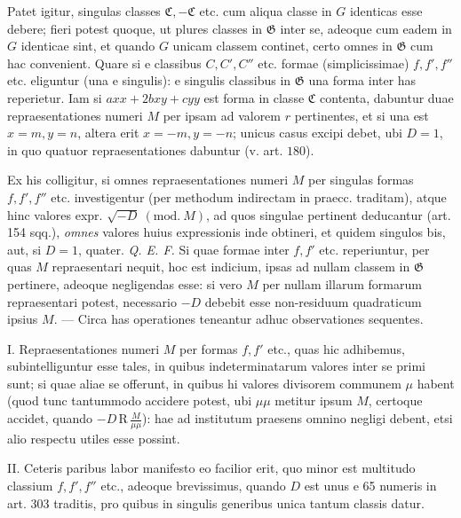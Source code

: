Patet igitur, singulas classes \(\mathfrak C,\allowbreak -\mathfrak C\) etc. cum aliqua classe in \(G\) identicas esse debere; fieri potest quoque, ut plures classes in \(\mathfrak G\) inter se, adeoque cum eadem in \(G\) identicae sint, et quando \(G\) unicam classem continet, certo omnes in \(\mathfrak G\) cum hac convenient. Quare si e classibus \(C,\allowbreak C',\allowbreak C''\) etc. formae (simplicissimae) \(f,\allowbreak f',\allowbreak f''\) etc. eliguntur (una e singulis): e singulis classibus in \(\mathfrak G\) una forma inter has reperietur. Iam si \(axx+2bxy+cyy\) est forma in classe \(\mathfrak C\) contenta, dabuntur duae repraesentationes numeri \(M\) per ipsam ad valorem \(r\) pertinentes, et si una est \(x=m,\allowbreak y=n\), altera erit \(x=-m,\allowbreak y=-n\); unicus casus excipi debet, ubi \(D=1\), in quo quatuor repraesentationes dabuntur (v. art. \(180\)).

Ex his colligitur, si omnes repraesentationes numeri \(M\) per singulas formas \(f,\allowbreak f',\allowbreak f''\) etc. investigentur (per methodum indirectam in praecc. traditam), atque
hinc valores expr. \(\surd{-D}\ (\mathrm{mod.}\ M)\), ad quos singulae pertinent deducantur (art. 154 sqq.), \textit{omnes} valores huius expressionis inde obtineri, et quidem singulos bis, aut, si \(D=1\), quater. \textit{Q. E. F.} Si quae formae inter \(f,\allowbreak f'\) etc. reperiuntur, per quas \(M\) repraesentari nequit, hoc est indicium, ipsas ad nullam classem in \(\mathfrak G\) pertinere, adeoque negligendas esse: si vero \(M\) per nullam illarum formarum repraesentari potest, necessario \(-D\) debebit esse non-residuum quadraticum ipsius \(M\). --- Circa has operationes teneantur adhuc observationes sequentes.

I. Repraesentationes numeri \(M\) per formas \(f,\allowbreak f'\) etc., quas hic adhibemus, subintelliguntur esse tales, in quibus indeterminatarum valores inter se primi sunt; si quae aliae se offerunt, in quibus hi valores divisorem communem \(\mu\) habent (quod tunc tantummodo accidere potest, ubi \(\mu\mu\) metitur ipsum \(M\), certoque accidet, quando \(-D\,\mathrm R\,\frac{M}{\mu\mu}\)): hae ad institutum praesens omnino negligi debent, etsi alio respectu utiles esse possint.

II. Ceteris paribus labor manifesto eo facilior erit, quo minor est multitudo classium \(f,\allowbreak f',\allowbreak f''\) etc., adeoque brevissimus, quando \(D\) est unus e 65 numeris in art. 303 traditis, pro quibus in singulis generibus unica tantum classis datur.

